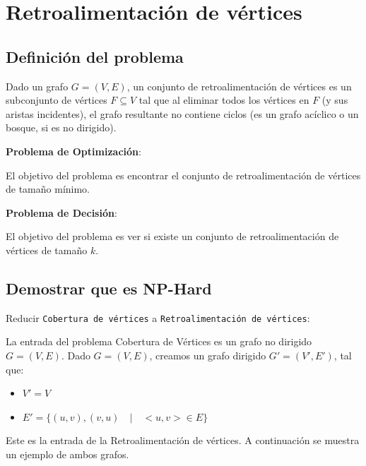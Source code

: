 \documentclass{article}
\begin{document}
\section{Retroalimentación de vértices}

    \subsection{Definición del problema}
    Dado un grafo $G=(V,E)$, un conjunto de retroalimentación de vértices es un subconjunto de vértices $F \subseteq V$ tal que al eliminar todos los vértices en $F$ (y sus aristas incidentes), el grafo resultante no contiene ciclos (es un grafo acíclico o un bosque, si es no dirigido).


    \textbf{Problema de Optimización}:
    
    El objetivo del problema es encontrar el conjunto de retroalimentación de vértices de tamaño mínimo.

    \textbf{Problema de Decisión}:
    
    El objetivo del problema es ver si existe un conjunto de retroalimentación de vértices de tamaño $k$.
    

\subsection{Demostrar que es NP-Hard}
Reducir \texttt{Cobertura de vértices} a \texttt{Retroalimentación de vértices}:

La entrada del problema Cobertura de Vértices es un grafo no dirigido $G=(V,E)$. Dado $G=(V,E)$, creamos un grafo dirigido $G'=(V',E')$, tal que:
\begin{itemize}
    \item \(V' = V\)
    \item \(E' = \{(u,v), (v,u) \quad | \quad  <u,v> \in E\}\)
\end{itemize}
Este es la entrada de la Retroalimentación de vértices. A continuación se muestra un ejemplo de ambos grafos.
\end{document}
